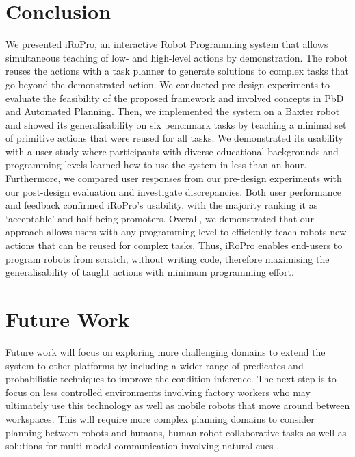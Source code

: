 \section{Conclusion} 
\label{sec:conclusion}
We presented iRoPro, an interactive Robot Programming system that allows simultaneous teaching of low- and high-level actions by demonstration.
The robot reuses the actions with a task planner to generate solutions to complex tasks that go beyond the demonstrated action.
We conducted pre-design experiments to evaluate the feasibility of the proposed framework and involved concepts in PbD and Automated Planning.
Then, we implemented the system on a Baxter robot and showed its generalisability on six benchmark tasks by teaching a minimal set of primitive actions that were reused for all tasks.
We demonstrated its usability with a user study where participants with diverse educational backgrounds and programming levels learned how to use the system in less than an hour.
Furthermore, we compared user responses from our pre-design experiments with our post-design evaluation and investigate discrepancies.
Both user performance and feedback confirmed iRoPro's usability, with the majority ranking it as `acceptable' and half being promoters.
Overall, we demonstrated that our approach allows users with any programming level to efficiently teach robots new actions that can be reused for complex tasks.
Thus, iRoPro enables end-users to program robots from scratch, without writing code, therefore maximising the generalisability of taught actions with minimum programming effort.

\section{Future Work} 
\label{sec:futurework}
Future work will focus on exploring more challenging domains to extend the system to other platforms by including a wider range of predicates and probabilistic techniques to improve the condition inference.
The next step is to focus on less controlled environments involving factory workers who may ultimately use this technology as well as mobile robots that move around between workspaces.
This will require more complex planning domains to consider planning between robots and humans, human-robot collaborative tasks as well as solutions for multi-modal communication involving natural cues \cite{pais2013assessing}.



